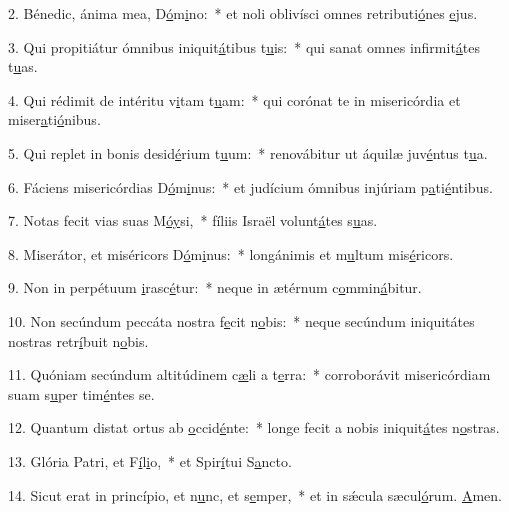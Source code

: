 2. Bénedic, ánima mea, D\uline{ó}m\uline{i}no:~* et noli oblivísci omnes retributi\uline{ó}nes \uline{e}jus.\par 
3. Qui propitiátur ómnibus iniquit\uline{á}tibus t\uline{u}is:~* qui sanat omnes infirmit\uline{á}tes t\uline{u}as.\par 
4. Qui rédimit de intéritu v\uline{i}tam t\uline{u}am:~* qui corónat te in misericórdia et miser\uline{a}ti\uline{ó}nibus.\par 
5. Qui replet in bonis desid\uline{é}rium t\uline{u}um:~* renovábitur ut áquilæ juv\uline{é}ntus t\uline{u}a.\par 
6. Fáciens misericórdias D\uline{ó}m\uline{i}nus:~* et judícium ómnibus injúriam p\uline{a}ti\uline{é}ntibus.\par 
7. Notas fecit vias suas M\uline{ó}\uline{y}si,~* fíliis Israël volunt\uline{á}tes s\uline{u}as.\par 
8. Miserátor, et miséricors D\uline{ó}m\uline{i}nus:~* longánimis et m\uline{u}ltum mis\uline{é}ricors.\par 
9. Non in perpétuum \uline{i}rasc\uline{é}tur:~* neque in ætérnum c\uline{o}mmin\uline{á}bitur.\par 
10. Non secúndum peccáta nostra f\uline{e}cit n\uline{o}bis:~* neque secúndum iniquitátes nostras retr\uline{í}buit n\uline{o}bis.\par 
11. Quóniam secúndum altitúdinem c\uline{æ}li a t\uline{e}rra:~* corroborávit misericórdiam suam s\uline{u}per tim\uline{é}ntes se.\par 
12. Quantum distat ortus ab \uline{o}ccid\uline{é}nte:~* longe fecit a nobis iniquit\uline{á}tes n\uline{o}stras.\par 
13. Glória Patri, et F\uline{í}l\uline{i}o,~* et Spir\uline{í}tui S\uline{a}ncto.\par 
14. Sicut erat in princípio, et n\uline{u}nc, et s\uline{e}mper,~* et in sǽcula sæcul\uline{ó}rum. \uline{A}men.\par 
